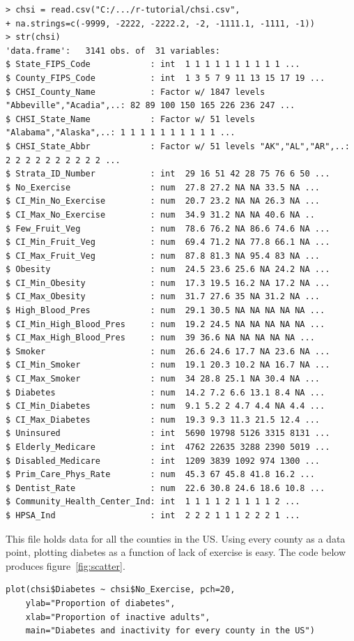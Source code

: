 \documentclass{report}
\begin{document}
	\begin{verbatim}
> chsi = read.csv("C:/.../r-tutorial/chsi.csv", 
+ na.strings=c(-9999, -2222, -2222.2, -2, -1111.1, -1111, -1))
> str(chsi)
'data.frame':   3141 obs. of  31 variables:
$ State_FIPS_Code            : int  1 1 1 1 1 1 1 1 1 1 ...
$ County_FIPS_Code           : int  1 3 5 7 9 11 13 15 17 19 ...
$ CHSI_County_Name           : Factor w/ 1847 levels "Abbeville","Acadia",..: 82 89 100 150 165 226 236 247 ...
$ CHSI_State_Name            : Factor w/ 51 levels "Alabama","Alaska",..: 1 1 1 1 1 1 1 1 1 1 ...
$ CHSI_State_Abbr            : Factor w/ 51 levels "AK","AL","AR",..: 2 2 2 2 2 2 2 2 2 2 ...
$ Strata_ID_Number           : int  29 16 51 42 28 75 76 6 50 ...
$ No_Exercise                : num  27.8 27.2 NA NA 33.5 NA ...
$ CI_Min_No_Exercise         : num  20.7 23.2 NA NA 26.3 NA ...
$ CI_Max_No_Exercise         : num  34.9 31.2 NA NA 40.6 NA ..
$ Few_Fruit_Veg              : num  78.6 76.2 NA 86.6 74.6 NA ...
$ CI_Min_Fruit_Veg           : num  69.4 71.2 NA 77.8 66.1 NA ...
$ CI_Max_Fruit_Veg           : num  87.8 81.3 NA 95.4 83 NA ...
$ Obesity                    : num  24.5 23.6 25.6 NA 24.2 NA ...
$ CI_Min_Obesity             : num  17.3 19.5 16.2 NA 17.2 NA ...
$ CI_Max_Obesity             : num  31.7 27.6 35 NA 31.2 NA ...
$ High_Blood_Pres            : num  29.1 30.5 NA NA NA NA NA ...
$ CI_Min_High_Blood_Pres     : num  19.2 24.5 NA NA NA NA NA ...
$ CI_Max_High_Blood_Pres     : num  39 36.6 NA NA NA NA NA ...
$ Smoker                     : num  26.6 24.6 17.7 NA 23.6 NA ...
$ CI_Min_Smoker              : num  19.1 20.3 10.2 NA 16.7 NA ...
$ CI_Max_Smoker              : num  34 28.8 25.1 NA 30.4 NA ...
$ Diabetes                   : num  14.2 7.2 6.6 13.1 8.4 NA ...
$ CI_Min_Diabetes            : num  9.1 5.2 2 4.7 4.4 NA 4.4 ...
$ CI_Max_Diabetes            : num  19.3 9.3 11.3 21.5 12.4 ...
$ Uninsured                  : int  5690 19798 5126 3315 8131 ...
$ Elderly_Medicare           : int  4762 22635 3288 2390 5019 ...
$ Disabled_Medicare          : int  1209 3839 1092 974 1300 ...
$ Prim_Care_Phys_Rate        : num  45.3 67 45.8 41.8 16.2 ...
$ Dentist_Rate               : num  22.6 30.8 24.6 18.6 10.8 ...
$ Community_Health_Center_Ind: int  1 1 1 1 2 1 1 1 1 2 ...
$ HPSA_Ind                   : int  2 2 2 1 1 1 2 2 2 1 ...
	\end{verbatim}
	
	This file holds data for all the counties in the US. Using every county as a data point, plotting diabetes as a function of lack of exercise is easy. The code below produces figure~\ref{fig:scatter}.
	\begin{verbatim}
plot(chsi$Diabetes ~ chsi$No_Exercise, pch=20,
	ylab="Proportion of diabetes", 
	xlab="Proportion of inactive adults", 
	main="Diabetes and inactivity for every county in the US")
	\end{verbatim}
	
\end{document}
